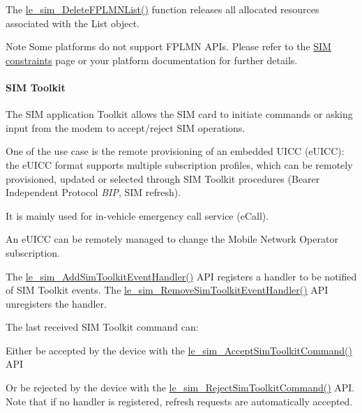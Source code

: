 The \hyperlink{le__sim__interface_8h_ac96338b9c989602b32e1d8555eb33a0b}{le\+\_\+sim\+\_\+\+Delete\+F\+P\+L\+M\+N\+List()} function releases all allocated resources associated with the List object.

\begin{DoxyNote}{Note}
Some platforms do not support F\+P\+L\+MN A\+P\+Is. Please refer to the \hyperlink{platformConstraintsSim}{S\+IM constraints} page or your platform documentation for further details.
\end{DoxyNote}
\hypertarget{c_sim_le_sim_stk}{}\paragraph{S\+I\+M Toolkit}\label{c_sim_le_sim_stk}
The S\+IM application Toolkit allows the S\+IM card to initiate commands or asking input from the modem to accept/reject S\+IM operations.

One of the use case is the remote provisioning of an embedded U\+I\+CC (e\+U\+I\+CC)\+: the e\+U\+I\+CC format supports multiple subscription profiles, which can be remotely provisioned, updated or selected through S\+IM Toolkit procedures (Bearer Independent Protocol {\itshape B\+IP}, S\+IM refresh).

It is mainly used for in-\/vehicle emergency call service (e\+Call).

An e\+U\+I\+CC can be remotely managed to change the Mobile Network Operator subscription.

The \hyperlink{le__sim__interface_8h_a85577728a34d70801cbb4deb8efd75d5}{le\+\_\+sim\+\_\+\+Add\+Sim\+Toolkit\+Event\+Handler()} A\+PI registers a handler to be notified of S\+IM Toolkit events. The \hyperlink{le__sim__interface_8h_a2485840533f80632a61096b1d7c5d8f2}{le\+\_\+sim\+\_\+\+Remove\+Sim\+Toolkit\+Event\+Handler()} A\+PI unregisters the handler.

The last received S\+IM Toolkit command can\+:
\begin{DoxyItemize}
\item Either be accepted by the device with the \hyperlink{le__sim__interface_8h_a8cc75a17466446c19c5bd941b1360e0e}{le\+\_\+sim\+\_\+\+Accept\+Sim\+Toolkit\+Command()} A\+PI
\item Or be rejected by the device with the \hyperlink{le__sim__interface_8h_a8cbdc50d62ddd5ea80386d27e16d954f}{le\+\_\+sim\+\_\+\+Reject\+Sim\+Toolkit\+Command()} A\+PI. Note that if no handler is registered, refresh requests are automatically accepted.
\end{DoxyItemize}

